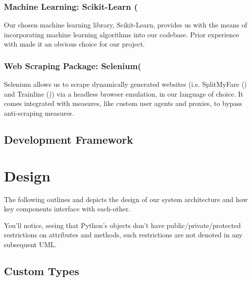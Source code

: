\documentclass[11pt]{article}
\begin{document}
\subsubsection{Machine Learning: Scikit-Learn (\texorpdfstring{\cite{scikitlearn}})} \label{scikitlearn}
Our chosen machine learning library, Scikit-Learn, provides us with the means of incorporating machine learning algorithms into our codebase. Prior experience with made it an obvious choice for our project.

\subsubsection{Web Scraping Package: Selenium(\texorpdfstring{\cite{selenium}})} \label{selenium}
Selenium allows us to scrape dynamically generated websites (i.e. SplitMyFare (\cite {splitmyfare}) and Trainline (\cite{trainline})) via a headless browser emulation, in our language of choice. It comes integrated with measures, like custom user agents and proxies, to bypass anti-scraping measures.






 
\subsection{Development Framework} \label{development-framework}



\section{Design} \label{design}

The following outlines and depicts the design of our system architecture and how key components interface with each-other.

You'll notice, seeing that Python's objects don't have public/private/protected restrictions on attributes and methods, such restrictions are not denoted in any subsequent UML.


\subsection{Custom Types} \label{custom-types}
\end{document}
